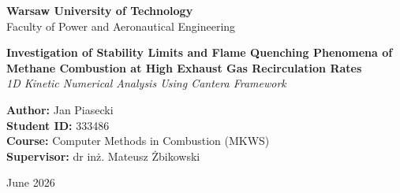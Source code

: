 \documentclass[11pt,a4paper]{article}
\begin{document}
\begin{titlepage}
    \centering
    \vspace*{2cm}
    
    \Large \textbf{Warsaw University of Technology} \\
    \large Faculty of Power and Aeronautical Engineering \\
    
    \vspace{4cm}
    
    \huge \textbf{Investigation of Stability Limits and Flame Quenching Phenomena of Methane Combustion at High Exhaust Gas Recirculation Rates} \\
    \vspace{0.5cm}
    \Large \textit{1D Kinetic Numerical Analysis Using Cantera Framework}
    
    \vspace{4cm}
    
    \begin{flushleft}
    \large
    \textbf{Author:} Jan Piasecki \\
    \textbf{Student ID:} 333486 \\
    \vspace{0.5cm}
    \textbf{Course:} Computer Methods in Combustion (MKWS) \\
    \textbf{Supervisor:} dr inż. Mateusz Żbikowski \\
    \end{flushleft}
    
    \vfill
    
    \large June 2026
    
\end{titlepage}

\tableofcontents
\newpage


\begin{abstract}
This report presents a numerical analysis of the impact of Exhaust Gas Recirculation (EGR) on the propagation and stability of a one-dimensional, laminar methane flame. Utilizing the Cantera software package and the GRI-Mech 3.0 kinetic mechanism, the flame behavior was investigated as a function of the air excess ratio ($\lambda$) and the increasing mass fraction of carbon dioxide in the oxidizer stream. The primary objective was to determine the critical stability limits (flame quenching limits) by applying a physical minimum velocity criterion coupled with an advanced numerical bisection method. The results demonstrate that the addition of an inert gas with high heat capacity significantly narrows the flammability limits of methane, ultimately leading to flame extinction.
\end{abstract}
\fontsize{13}{15.5}\selectfont 
\vspace{1cm}
\end{document}
